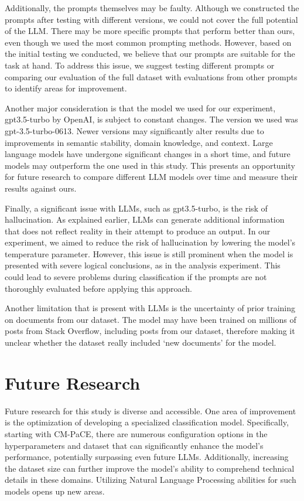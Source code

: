 \documentclass[english,bachelor]{swsLeipzig}
\begin{document}
Additionally, the prompts themselves may be faulty. Although we constructed the prompts after testing 
with different versions, we could not cover the full potential of the LLM. There may be more specific prompts that perform better than ours, even though we used the most common prompting methods. However, based on the initial testing we conducted, we believe that our prompts are suitable for the task at hand. To address this issue, we suggest testing different prompts or comparing our evaluation of the full dataset with evaluations from other prompts to identify areas for improvement.

Another major consideration is that the model we used for our experiment, gpt3.5-turbo by OpenAI, is 
subject to constant changes. The version we used was gpt-3.5-turbo-0613. Newer versions may significantly alter results due to improvements in semantic stability, domain knowledge, and context. Large language models have undergone significant changes in a short time, and future models may outperform the one used in this study. This presents an opportunity for future research to compare different LLM models over time and measure their results against ours.

Finally, a significant issue with LLMs, such as gpt3.5-turbo, is the risk of hallucination. As explained 
earlier, LLMs can generate additional information that does not reflect reality in their attempt to produce an output. In our experiment, we aimed to reduce the risk of hallucination by lowering the model's temperature parameter. However, this issue is still prominent when the model is presented with severe logical conclusions, as in the analysis experiment. This could lead to severe problems during classification if the prompts are not thoroughly evaluated before applying this approach.

Another limitation that is present with LLMs is the uncertainty of prior training on documents from our dataset. The model may have been trained on millions of posts from Stack Overflow, including posts from our dataset, therefore making it unclear whether the dataset really included `new documents' for the model. 

\section{Future Research}

Future research for this study is diverse and accessible. One area of improvement is the optimization 
of developing a specialized classification model. Specifically, starting with CM-PaCE, there are numerous configuration options in the hyperparameters and dataset that can significantly enhance the model's performance, potentially surpassing even future LLMs. Additionally, increasing the dataset size can further improve the model's ability to comprehend technical details in these domains. Utilizing Natural Language Processing abilities for such models opens up new areas. 
\end{document}
